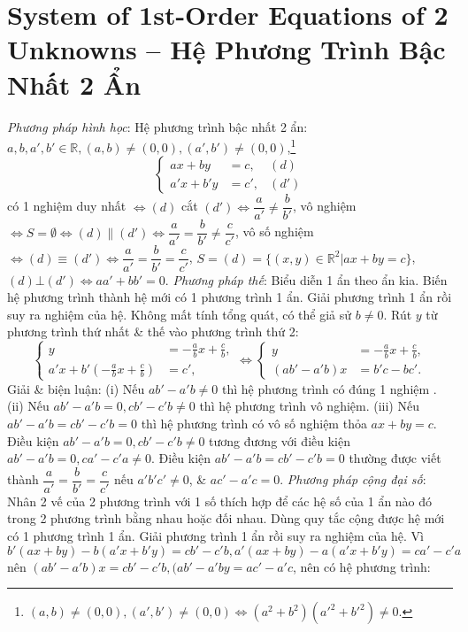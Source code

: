 \documentclass{article}
\begin{document}
\section{System of 1st-Order Equations of 2 Unknowns -- Hệ Phương Trình Bậc Nhất 2 Ẩn}
 \textit{Phương pháp hình học}: Hệ phương trình bậc nhất 2 ẩn: $a,b,a',b'\in\mathbb{R},(a,b)\ne(0,0),(a',b')\ne(0,0)$,\footnote{$(a,b)\ne(0,0),(a',b')\ne(0,0)\Leftrightarrow(a^2 + b^2)(a'^2 + b'^2)\ne0$.}
\begin{equation}
	\label{system of linear eqns 2 unknowns}
	\boxed{\left\{\begin{split}
		ax + by &= c, &(d)\\
		a'x + b'y &= c', &(d')
	\end{split}\right.}
\end{equation}
có 1 nghiệm duy nhất $\Leftrightarrow(d)$ cắt $(d')\Leftrightarrow\dfrac{a}{a'}\ne\dfrac{b}{b'}$, vô nghiệm $\Leftrightarrow S = \emptyset\Leftrightarrow(d)\parallel(d')\Leftrightarrow\dfrac{a}{a'} = \dfrac{b}{b'}\ne\dfrac{c}{c'}$, vô số nghiệm $\Leftrightarrow(d)\equiv(d')\Leftrightarrow\dfrac{a}{a'} = \dfrac{b}{b'} = \dfrac{c}{c'}$, $S = (d) = \{(x,y)\in\mathbb{R}^2|ax + by = c\}$, $(d)\bot(d')\Leftrightarrow aa' + bb' = 0$.  \textit{Phương pháp thế}: Biểu diễn 1 ẩn theo ẩn kia. Biến hệ phương trình thành hệ mới có 1 phương trình 1 ẩn. Giải phương trình 1 ẩn rồi suy ra nghiệm của hệ. Không mất tính tổng quát, có thể giả sử $b\ne0$. Rút $y$ từ phương trình thứ nhất \& thế vào phương trình thứ 2:
\begin{equation*}
	\left\{\begin{split}
		y &= -\frac{a}{b}x + \frac{c}{b},\\
		a'x + b'\left(-\frac{a}{b}x + \frac{c}{b}\right) &= c',
	\end{split}\right.\Leftrightarrow\left\{\begin{split}
		y &= -\frac{a}{b}x + \frac{c}{b},\\
		(ab' - a'b)x &= b'c - bc'.
	\end{split}\right.
\end{equation*}
Giải \& biện luận: (i) Nếu $ab' - a'b\ne0$ thì hệ phương trình có đúng 1 nghiệm . (ii) Nếu $ab' - a'b = 0,cb' - c'b\ne0$ thì hệ phương trình vô nghiệm. (iii) Nếu $ab' - a'b = cb' - c'b = 0$ thì hệ phương trình có vô số nghiệm thỏa $ax + by = c$. Điều kiện $ab' - a'b = 0,cb' - c'b\ne0$ tương đương với điều kiện $ab' - a'b = 0,ca' - c'a\ne0$. Điều kiện $ab' - a'b = cb' - c'b = 0$ thường được viết thành $\dfrac{a}{a'} = \dfrac{b}{b'} = \dfrac{c}{c'}$ nếu $a'b'c'\ne0$, \& $ac' - a'c = 0$.  \textit{Phương pháp cộng đại số}: Nhân 2 vế của 2 phương trình với 1 số thích hợp để các hệ số của 1 ẩn nào đó trong 2 phương trình bằng nhau hoặc đối nhau. Dùng quy tắc cộng được hệ mới có 1 phương trình 1 ẩn. Giải phương trình 1 ẩn rồi suy ra nghiệm của hệ. Vì $b'(ax + by) - b(a'x + b'y) = cb' - c'b,a'(ax + by) - a(a'x + b'y) = ca' - c'a$ nên $(ab' - a'b)x = cb' - c'b,(ab' - a'b y = ac' - a'c$, nên có hệ phương trình:
\end{document}
